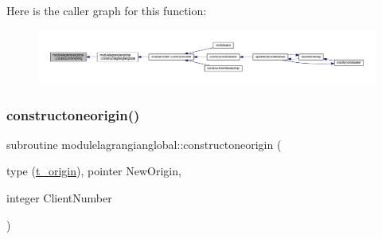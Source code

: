 Here is the caller graph for this function\+:\nopagebreak
\begin{figure}[H]
\begin{center}
\leavevmode
\includegraphics[width=350pt]{namespacemodulelagrangianglobal_ae93400b6f236b2e44a7b90febb2be220_icgraph}
\end{center}
\end{figure}
\mbox{\label{namespacemodulelagrangianglobal_a13e19af68aa547fbcd1d97158976b7ef}} 
\subsubsection{\texorpdfstring{constructoneorigin()}{constructoneorigin()}}
{\footnotesize\ttfamily subroutine modulelagrangianglobal\+::constructoneorigin (\begin{DoxyParamCaption}\item[{type (\mbox{\hyperlink{structmodulelagrangianglobal_1_1t__origin}{t\+\_\+origin}}), pointer}]{New\+Origin,  }\item[{integer}]{Client\+Number }\end{DoxyParamCaption})\hspace{0.3cm}{\ttfamily [private]}}

